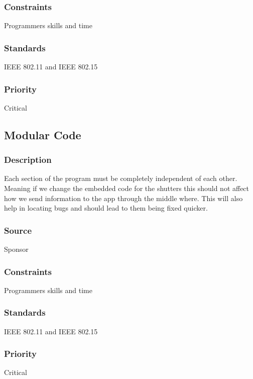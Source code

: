 \subsubsection{Constraints}
Programmers skills and time
\subsubsection{Standards}
IEEE 802.11 and IEEE 802.15
\subsubsection{Priority}
Critical

\subsection{Modular Code }
\subsubsection{Description}
Each section of the program must be completely independent of each other. Meaning if we change the embedded code for the shutters this should not affect how we send information to the app through the middle where. This will also help in locating bugs and should lead to them being fixed quicker.

\subsubsection{Source}
Sponsor
\subsubsection{Constraints}
Programmers skills and time
\subsubsection{Standards}
IEEE 802.11 and IEEE 802.15
\subsubsection{Priority}
Critical